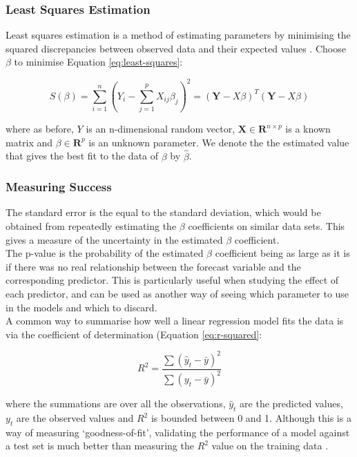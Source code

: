 \documentclass[12pt, a4paper]{article}
\begin{document}
\subsubsection{Least Squares Estimation}

Least squares estimation is a method of estimating parameters by minimising the squared discrepancies between observed data and their expected values \cite{least-squares-estimation}. Choose $\beta$ to minimise Equation \ref{eq:least-squares}:

\begin{equation}
    S(\beta) = \sum_{i=1}^n(Y_i - \sum_{j=1}^pX_{ij}\beta_j)^2 = (\mathbf{Y} - X\beta)^T(\mathbf{Y} - X\beta)
    \label{eq:least-squares}
\end{equation}

where as before, $Y$ is an n-dimensional random vector, $\mathbf{X} \in \mathbf{R} ^{n \times p}$ is a known matrix and $\beta \in \mathbf{R}^p$ is an unknown parameter. We denote the the estimated value that gives the best fit to the data of $\beta$ by $\hat \beta$.

\subsubsection{Measuring Success}

The standard error is the equal to the standard deviation, which would be obtained from repeatedly estimating the $\beta$ coefficients on similar data sets. This gives a measure of the uncertainty in the estimated $\beta$ coefficient. \\

The p-value is the probability of the estimated $\beta$ coefficient being as large as it is if there was no real relationship between the forecast variable and the corresponding predictor. This is particularly useful when studying the effect of each predictor, and can be used as another way of seeing which parameter to use in the models and which to discard. \\ 

A common way to summarise how well a linear regression model fits the data is via the coefficient of determination (Equation \ref{eq:r-squared}:

\begin{equation}
    R^2 = \frac{\sum(\hat y_t - \bar y)^2}{\sum(y_t - \bar y)^2}
    \label{eq:r-squared}
\end{equation}

where the summations are over all the observations, $\hat y_t$ are the predicted values, $y_t$ are the observed values and $R^2$ is bounded between 0 and 1. Although this is a way of measuring `goodness-of-fit', validating the performance of a model against a test set is much better than measuring the $R^2$ value on the training data \cite{forecasting-book}. \\
\end{document}
